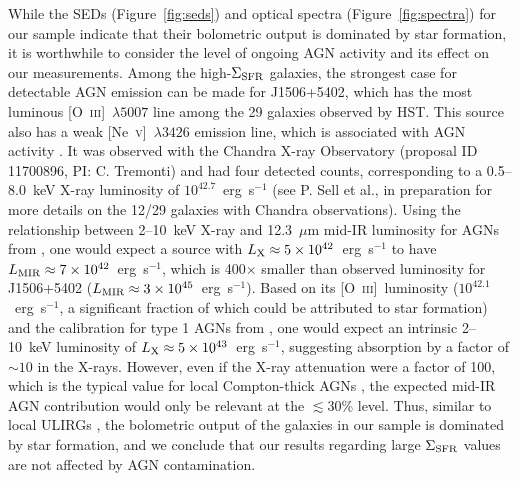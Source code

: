 \documentclass[apj]{emulateapj}
\newcommand{\nev}{[\textrm{Ne}~\textsc{v}]}
\newcommand{\oiii}{[\textrm{O}~\textsc{iii}]}
\newcommand{\sigmasfr}{\Sigma_{\textnormal{\scriptsize{SFR}}}}
\begin{document}
While the SEDs (Figure~\ref{fig:seds}) and optical spectra
(Figure~\ref{fig:spectra}) for our sample indicate that their
bolometric output is dominated by star formation, it is worthwhile to
consider the level of ongoing AGN activity and its effect on our
measurements.  Among the high-$\sigmasfr$ galaxies, the strongest case
for detectable AGN emission can be made for J1506+5402, which has the
most luminous \oiii~$\lambda5007$ line among the 29 galaxies observed
by HST.  This source also has a weak \nev~$\lambda3426$ emission line,
which is associated with AGN activity \citep[e.g.,][]{abe08,gil10}.
It was observed with the Chandra X-ray Observatory (proposal ID
11700896, PI: C. Tremonti) and had four detected counts, corresponding
to a 0.5--8.0~keV X-ray luminosity of $10^{42.7}$~erg~s$^{-1}$ (see
P. Sell et al., in preparation for more details on the 12/29 galaxies
with Chandra observations).  Using the relationship between 2--10~keV
X-ray and 12.3~$\mu$m mid-IR luminosity for AGNs from \citet{gan09},
one would expect a source with
$L_{\textnormal{\scriptsize{X}}}\approx5\times10^{42}$~erg~s$^{-1}$ to
have
$L_{\textnormal{\scriptsize{MIR}}}\approx7\times10^{42}$~erg~s$^{-1}$,
which is 400$\times$ smaller than observed luminosity for J1506+5402
($L_{\textnormal{\scriptsize{MIR}}}\approx3\times10^{45}$~erg~s$^{-1}$).
Based on its \oiii\ luminosity ($10^{42.1}$~erg~s$^{-1}$, a
significant fraction of which could be attributed to star formation)
and the calibration for type 1 AGNs from \citet{hec05}, one would
expect an intrinsic 2--10~keV luminosity of
$L_{\textnormal{\scriptsize{X}}}\approx5\times10^{43}$~erg~s$^{-1}$,
suggesting absorption by a factor of $\sim10$ in the X-rays.  However,
even if the X-ray attenuation were a factor of 100, which is the
typical value for local Compton-thick AGNs \citep{dia09}, the expected
mid-IR AGN contribution would only be relevant at the $\lesssim$30\%
level.  Thus, similar to local ULIRGs \citep[e.g.,][]{far07}, the
bolometric output of the galaxies in our sample is dominated by star
formation, and we conclude that our results regarding large
$\sigmasfr$ values are not affected by AGN contamination.




\end{document}
